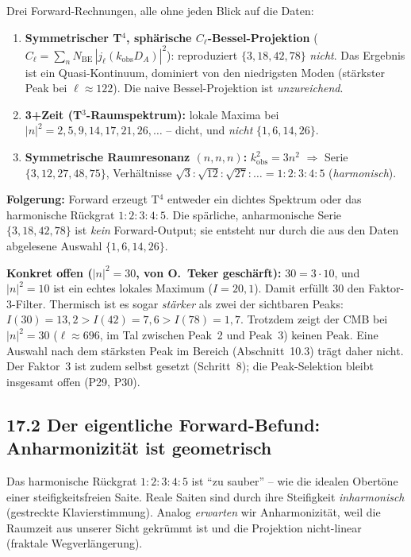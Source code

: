 Drei Forward-Rechnungen, alle ohne jeden Blick auf die Daten:

\begin{enumerate}
  \item \textbf{Symmetrischer T$^4$, sphärische $C_\ell$-Bessel-Projektion}
        ($C_\ell = \sum_n N_\mathrm{BE}\,|j_\ell(k_\mathrm{obs}D_A)|^2$):
        reproduziert $\{3,18,42,78\}$ \emph{nicht}. Das Ergebnis ist ein
        Quasi-Kontinuum, dominiert von den niedrigsten Moden
        (stärkster Peak bei $\ell\approx122$). Die naive Bessel-Projektion
        ist \emph{unzureichend}.
  \item \textbf{3+Zeit (T$^3$-Raumspektrum):} lokale Maxima bei
        $|n|^2=2,5,9,14,17,21,26,\ldots$ -- dicht, und \emph{nicht}
        $\{1,6,14,26\}$.
  \item \textbf{Symmetrische Raumresonanz $(n,n,n)$:} $k^2_\mathrm{obs}=3n^2$
        $\Rightarrow$ Serie $\{3,12,27,48,75\}$, Verhältnisse
        $\sqrt{3}:\sqrt{12}:\sqrt{27}:\ldots = 1:2:3:4:5$
        (\emph{harmonisch}).
\end{enumerate}

\textbf{Folgerung:} Forward erzeugt T$^4$ entweder ein dichtes Spektrum
oder das harmonische Rückgrat $1:2:3:4:5$. Die spärliche, anharmonische
Serie $\{3,18,42,78\}$ ist \emph{kein} Forward-Output; sie entsteht nur
durch die aus den Daten abgelesene Auswahl $\{1,6,14,26\}$.

\textbf{Konkret offen ($|n|^2=30$, von O.~Teker geschärft):} $30=3\cdot10$,
und $|n|^2=10$ ist ein echtes lokales Maximum ($I=20{,}1$). Damit erfüllt
$30$ den Faktor-3-Filter. Thermisch ist es sogar \emph{stärker} als zwei
der sichtbaren Peaks: $I(30)=13{,}2 > I(42)=7{,}6 > I(78)=1{,}7$. Trotzdem
zeigt der CMB bei $|n|^2=30$ ($\ell\approx696$, im Tal zwischen Peak~2 und
Peak~3) keinen Peak. Eine Auswahl nach dem stärksten Peak im Bereich
(Abschnitt~10.3) trägt daher nicht. Der Faktor~3 ist zudem selbst gesetzt
(Schritt~8); die Peak-Selektion bleibt insgesamt offen (P29, P30).

\subsection*{17.2 Der eigentliche Forward-Befund: Anharmonizität ist geometrisch}

Das harmonische Rückgrat $1:2:3:4:5$ ist ``zu sauber'' -- wie die idealen
Obertöne einer steifigkeitsfreien Saite. Reale Saiten sind durch ihre
Steifigkeit \emph{inharmonisch} (gestreckte Klavierstimmung). Analog
\emph{erwarten} wir Anharmonizität, weil die Raumzeit aus unserer Sicht
gekrümmt ist und die Projektion nicht-linear (fraktale Wegverlängerung).

